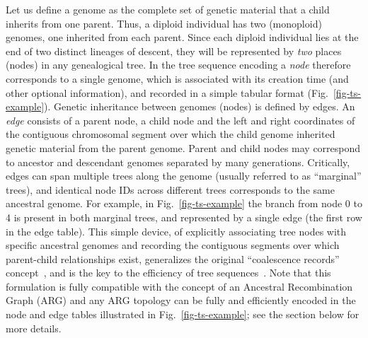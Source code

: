 \documentclass[9pt,twocolumn,twoside,lineno]{gsajnl}
\begin{document}
Let us define a genome as the complete set of genetic material
that a child inherits from one parent. Thus, a diploid individual
has two (monoploid) genomes, one inherited from each parent. Since
each diploid individual lies at the end of two distinct lineages
of descent, they will be represented by \emph{two} places (nodes)
in any genealogical tree. In the tree sequence encoding a
\emph{node} therefore corresponds to a single genome, which
is associated with its creation time (and other optional information),
and recorded in a simple tabular format (Fig.~\ref{fig-ts-example}).
Genetic inheritance between genomes (nodes) %
is defined by edges.
An \emph{edge} consists of a
parent node, a child node and the left and right coordinates
of the contiguous chromosomal segment over which
the child genome inherited genetic material from the parent genome.
Parent and child nodes may correspond to ancestor and descendant
genomes separated by many generations.
Critically, edges can span multiple trees  along the
genome (usually referred to as ``marginal'' trees),
and identical node IDs across different trees corresponds
to the same ancestral genome.
For example, in Fig.~\ref{fig-ts-example} the branch from node
0 to 4 is present in both marginal trees, and represented
by a single edge (the first row in the edge table).
This simple device, of explicitly associating tree nodes
with specific ancestral genomes and recording the
contiguous segments over which parent-child relationships exist,
generalizes the original
``coalescence records'' concept~\citep{kelleher2016efficient},
and is the key to the efficiency of tree
sequences~\citep{
kelleher2018efficient,kelleher2019inferring,ralph2020efficiently}.
Note that this formulation is fully compatible with
the concept of an Ancestral Recombination Graph (ARG)
and any ARG topology can be fully and efficiently encoded
in the node and edge tables illustrated in Fig.~\ref{fig-ts-example};
see the  section below for
more details.
\end{document}
